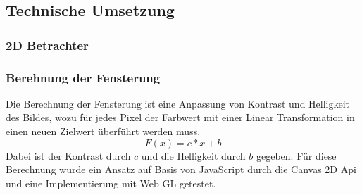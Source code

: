 \subsection{Technische Umsetzung}
\label{sec:Technische Umsetzung}

\subsubsection{2D Betrachter}
\label{sec:2D Betrachter}


\subsubsection{Berehnung der Fensterung}
\label{sec:Berehnung der Fensterung}
Die Berechnung der Fensterung ist eine Anpassung von Kontrast und Helligkeit des Bildes,
wozu für jedes Pixel der Farbwert mit einer Linear Transformation in einen neuen Zielwert überführt werden muss.
\begin{equation}
        F(x) = c*x + b
\end{equation}
Dabei ist der Kontrast durch $c$ und die Helligkeit durch $b$ gegeben.
Für diese Berechnung wurde ein Ansatz auf Basis von JavaScript durch die Canvas 2D Api und eine Implementierung mit Web GL getestet.

